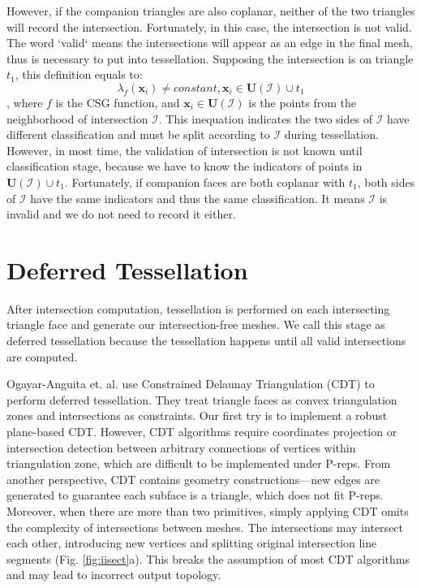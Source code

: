 \documentclass[10pt,journal,compsoc]{IEEEtran}
\begin{document}
However, if the companion triangles are also coplanar, neither of the two triangles will record the intersection. Fortunately, in this case, the intersection is not valid. The word `valid` means the intersections will appear as an edge in the final mesh, thus is necessary to put into tessellation. Supposing the intersection is on triangle $t_1$, this definition equals to:
\begin{equation}
\lambda_f(\bm{x}_i) \neq constant, \bm{x}_i \in \bm{U}(\mathcal{I}) \cup t_1
\end{equation}
, where $f$ is the CSG function, and $\bm{x}_i \in \bm{U}(\mathcal{I})$ is the points from the neighborhood of  intersection $\mathcal{I}$. This inequation indicates the two sides of $\mathcal{I}$ have different classification and must be split according to $\mathcal{I}$ during tessellation. However, in most time, the validation of intersection is not known until classification stage, because we have to know the indicators of points in $\bm{U}(\mathcal{I}) \cup t_1$. Fortunately, if companion faces are both coplanar with $t_1$, both sides of $\mathcal{I}$ have the same indicators and thus the same classification. It means $\mathcal{I}$ is invalid and we do not need to record it either.

\section{Deferred Tessellation}



\label{sec:tessellation}
After intersection computation, tessellation is performed on each intersecting triangle face and generate our intersection-free meshes. We call this stage as deferred tessellation because the tessellation happens until all valid intersections are computed.

Ogayar-Anguita et. al. \cite{ogayar2015deferred} use Constrained Delaunay Triangulation (CDT) to perform deferred tessellation. They treat triangle faces as convex triangulation zones and intersections as constraints. Our first try is to implement a robust plane-based CDT. However, CDT algorithms \cite{chew1989constrained,preparata2012computational} require coordinates projection or intersection detection between arbitrary connections of vertices within triangulation zone, which are difficult to be implemented under P-reps. From another perspective, CDT contains geometry constructions---new edges are generated to guarantee each subface is a triangle, which does not fit P-reps. Moreover, when there are more than two primitives, simply applying CDT omits the complexity of intersections between meshes. The intersections may intersect each other, introducing new vertices and splitting original intersection line segments (Fig. \ref{fig:iisect}a). This breaks the assumption of most CDT algorithms and may lead to incorrect output topology.
\end{document}
